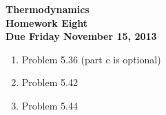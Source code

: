 \documentclass[12pt]{article}
\begin{document}
\pagestyle{empty}
 
\begin{center}
{\large {\bf Thermodynamics}}\\
\medskip
{\large {\bf Homework Eight}}\\
\medskip
{ {\bf Due Friday November 15, 2013}}\\
\end{center}
\bigskip
\begin{enumerate}
 
  \item Problem 5.36 (part c is optional)

  \item Problem 5.42
  \item Problem 5.44

\end{enumerate}
\end{document}
